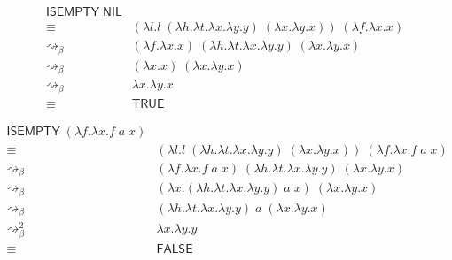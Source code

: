 \documentclass{article}
\begin{document}
\begin{enumerate}[a)]
    \begin{align*}
      \mathsf{ISEMPTY}\;\mathsf{NIL} & \\ 
        \equiv& (
          \lambda l.
            l\;
            (\lambda h.\lambda t.\lambda x.\lambda y.y)\;
            (\lambda x.\lambda y.x)
        )\;(\lambda f.\lambda x.x) \\ 
        \rightsquigarrow_\beta&
          (\lambda f.\lambda x.x)\;
          (\lambda h.\lambda t.\lambda x.\lambda y.y)\;
          (\lambda x.\lambda y.x) \\ 
        \rightsquigarrow_\beta&
          (\lambda x.x)\;
          (\lambda x.\lambda y.x) \\
        \rightsquigarrow_\beta&
          \lambda x.\lambda y.x \\ 
        \equiv& \mathsf{TRUE}
    \end{align*}

    \begin{align*}
      \mathsf{ISEMPTY}\;(\lambda f.\lambda x.f\;a\;x) & \\ 
        \equiv& (
          \lambda l.
            l\;
            (\lambda h.\lambda t.\lambda x.\lambda y.y)\;
            (\lambda x.\lambda y.x)
        )\;(\lambda f.\lambda x.f\;a\;x) \\ 
        \rightsquigarrow_\beta&
          (\lambda f.\lambda x.f\;a\;x)\;
          (\lambda h.\lambda t.\lambda x.\lambda y.y)\;
          (\lambda x.\lambda y.x) \\ 
        \rightsquigarrow_\beta&
          (\lambda x.(
            \lambda h.\lambda t.\lambda x.\lambda y.y)\;a\;x
          )\;
          (\lambda x.\lambda y.x) \\
        \rightsquigarrow_\beta&
          (\lambda h.\lambda t.\lambda x.\lambda y.y)\;a\;(
            \lambda x.\lambda y.x
          ) \\
        \rightsquigarrow_\beta^2&
          \lambda x.\lambda y.y \\ 
        \equiv& \mathsf{FALSE}
    \end{align*}

\end{enumerate}


\end{document}
